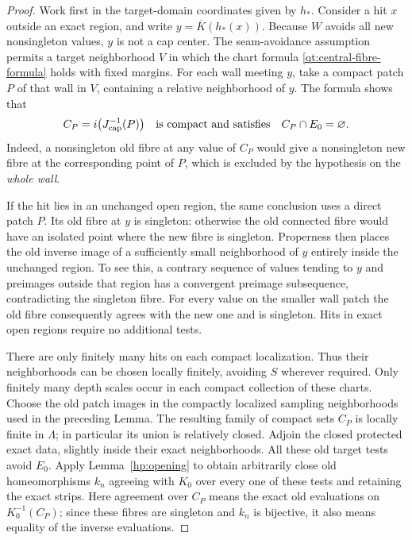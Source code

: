 \documentclass[11pt]{article}
\numberwithin{equation}{section}
\theoremstyle{definition}
\theoremstyle{remark}
\begin{document}
\begin{proof}
Work first in the target-domain coordinates given by $h_*$.
Consider a hit $x$ outside an exact region, and write
$y=\overline K(h_*(x))$.  Because $W$ avoids all new nonsingleton
values, $y$ is not a cap center.  The seam-avoidance assumption
permits a target neighborhood $V$ in which the chart formula
\eqref{qt:central-fibre-formula} holds with fixed margins.  For each
wall meeting $y$, take a compact patch $P$ of that wall in $V$,
containing a relative neighborhood of $y$.  The formula shows that
\begin{equation}\label{qt:central-old-wall-test}
 C_P=i\bigl(J_{\rm cap}^{-1}(P)\bigr)
             \quad\text{is compact and satisfies}\quad C_P\cap E_0=\varnothing.
\end{equation}
Indeed, a nonsingleton old fibre at any value of $C_P$ would give
a nonsingleton new fibre at the corresponding point of $P$, which
is excluded by the hypothesis on the \emph{whole wall}.

If the hit lies in an unchanged open region, the same conclusion
uses a direct patch $P$.  Its old fibre at $y$ is singleton:
otherwise the old connected fibre would have an isolated point
where the new fibre is singleton.  Properness then places the old
inverse image of a sufficiently small neighborhood of $y$ entirely
inside the unchanged region.  To see this, a contrary sequence of
values tending to $y$ and preimages outside that region has a
convergent preimage subsequence, contradicting the singleton fibre.
For every value on the smaller wall patch the old fibre consequently
agrees with the new one and is singleton.  Hits in exact open
regions require no additional tests.

There are only finitely many hits on each compact localization.
Thus their neighborhoods can be chosen locally finitely, avoiding
$S$ wherever required.  Only finitely many depth scales occur in
each compact collection of these charts.  Choose the old patch
images in the compactly localized sampling neighborhoods used in
the preceding Lemma.  The resulting family of compact sets $C_P$
is locally finite in $\Lambda$; in particular its union is relatively
closed.  Adjoin the closed protected exact data, slightly inside
their exact neighborhoods.  All these old target tests avoid $E_0$.
Apply Lemma~\ref{hp:opening} to obtain arbitrarily close old
homeomorphisms $k_n$ agreeing with $K_0$ over every one of these
tests and retaining the exact strips.  Here agreement over $C_P$
means the exact old evaluations on $K_0^{-1}(C_P)$; since these
fibres are singleton and $k_n$ is bijective, it also means equality
of the inverse evaluations.


\end{proof}
\end{document}
